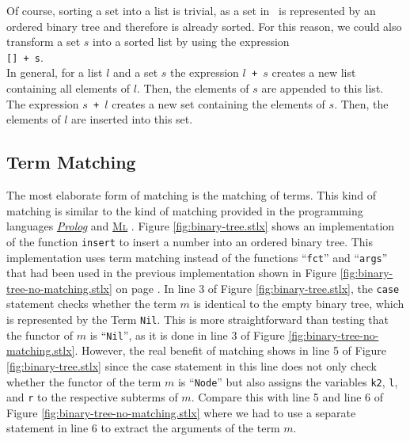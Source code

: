 Of course, sorting a set into a list is trivial, as a
set in \setlx\ is represented by an ordered binary tree and therefore is already sorted.
For this reason, we could also transform a set $s$ into a sorted list by using the expression
\\[0.2cm]
\hspace*{1.3cm}
\texttt{[] + s}.
\\[0.2cm]
In general, for a list $l$ and a set $s$ the expression \texttt{$l$ + $s$} creates a new
list containing all elements of $l$.  Then, the elements of $s$ are appended to this
list.  The expression \texttt{$s$ + $l$} creates a new set containing the elements of
$s$.  Then, the elements of $l$ are inserted into this set.


\subsection{Term Matching}
The most elaborate form of matching is the matching of terms.  This kind of matching is similar to
the kind of matching provided in the programming languages 
\href{http://en.wikipedia.org/wiki/Prolog}{\textsl{Prolog}} and 
\href{http://en.wikipedia.org/wiki/ML_(programming_language)}{\textsc{Ml}} \cite{milner:90}.
Figure \ref{fig:binary-tree.stlx} shows an implementation of the function \texttt{insert} to insert
a number into an ordered binary tree.  This implementation uses
term matching instead of the functions ``\texttt{fct}'' and ``\texttt{args}'' that had been used in
the previous implementation shown in Figure \ref{fig:binary-tree-no-matching.stlx} on page
\pageref{fig:binary-tree-no-matching.stlx}.  In line 3 of Figure \ref{fig:binary-tree.stlx}, the
\texttt{case} statement checks whether the term $m$ is identical to the empty binary tree, which is
represented by the Term \texttt{Nil}.  This is more straightforward than
testing that the functor of $m$ is ``\texttt{Nil}'', as it is done in line 3 of Figure
\ref{fig:binary-tree-no-matching.stlx}.  However, the real benefit of matching shows in line 5 of
Figure \ref{fig:binary-tree.stlx} since the case statement in this line does not only check whether
the functor of the term $m$ is ``\texttt{Node}'' but also assigns the variables \texttt{k2}, \texttt{l}, and
\texttt{r} to the respective subterms of $m$.  Compare this with line 5 and line 6 of Figure
\ref{fig:binary-tree-no-matching.stlx} where we had to use a separate statement in line 6 to extract
the arguments of the term $m$.


